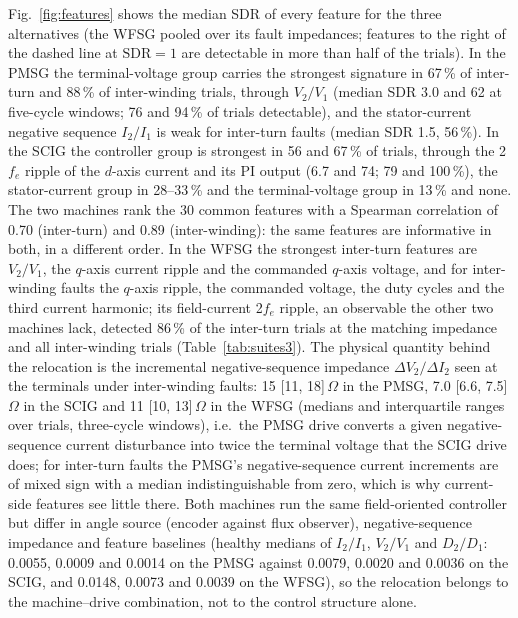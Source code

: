 

Fig.~\ref{fig:features} shows the median SDR of every feature for the three alternatives (the WFSG pooled over its fault impedances; features to the right of the dashed line at $\mathrm{SDR}=1$ are detectable in more than half of the trials). In the PMSG the terminal-voltage group carries the strongest signature in 67\,\% of inter-turn and 88\,\% of inter-winding trials, through $V_2/V_1$ (median SDR 3.0 and 62 at five-cycle windows; 76 and 94\,\% of trials detectable), and the stator-current negative sequence $I_2/I_1$ is weak for inter-turn faults (median SDR 1.5, 56\,\%). In the SCIG the controller group is strongest in 56 and 67\,\% of trials, through the 2$f_e$ ripple of the $d$-axis current and its PI output (6.7 and 74; 79 and 100\,\%), the stator-current group in 28--33\,\% and the terminal-voltage group in 13\,\% and none. The two machines rank the 30 common features with a Spearman correlation of 0.70 (inter-turn) and 0.89 (inter-winding): the same features are informative in both, in a different order. In the WFSG the strongest inter-turn features are $V_2/V_1$, the $q$-axis current ripple and the commanded $q$-axis voltage, and for inter-winding faults the $q$-axis ripple, the commanded voltage, the duty cycles and the third current harmonic; its field-current 2$f_e$ ripple, an observable the other two machines lack, detected 86\,\% of the inter-turn trials at the matching impedance and all inter-winding trials (Table~\ref{tab:suites3}). The physical quantity behind the relocation is the incremental negative-sequence impedance $\Delta V_2/\Delta I_2$ seen at the terminals under inter-winding faults: 15 [11, 18]\,$\Omega$ in the PMSG, 7.0 [6.6, 7.5]\,$\Omega$ in the SCIG and 11 [10, 13]\,$\Omega$ in the WFSG (medians and interquartile ranges over trials, three-cycle windows), i.e.\ the PMSG drive converts a given negative-sequence current disturbance into twice the terminal voltage that the SCIG drive does; for inter-turn faults the PMSG's negative-sequence current increments are of mixed sign with a median indistinguishable from zero, which is why current-side features see little there. Both machines run the same field-oriented controller but differ in angle source (encoder against flux observer), negative-sequence impedance and feature baselines (healthy medians of $I_2/I_1$, $V_2/V_1$ and $D_2/D_1$: 0.0055, 0.0009 and 0.0014 on the PMSG against 0.0079, 0.0020 and 0.0036 on the SCIG, and 0.0148, 0.0073 and 0.0039 on the WFSG), so the relocation belongs to the machine--drive combination, not to the control structure alone.

